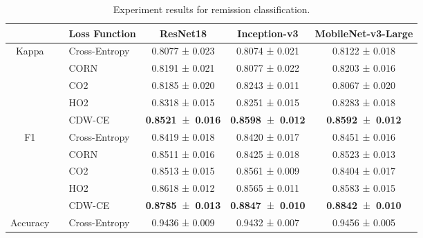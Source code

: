 \documentclass[runningheads]{llncs}
\begin{document}
\begin{table}[t!]
\caption{Experiment results for remission classification.}
\label{tab:experiment_results_remission}
\begin{adjustbox}{center}
\begin{tabular}{cllccc} 
\hline
                          &  & \textbf{Loss Function} & \textbf{ResNet18}                & \textbf{Inception-v3}            & \textbf{MobileNet-v3-Large}       \\ 
\hline
\multirow{5}{*}{Kappa}    &  & Cross-Entropy          & 0.8077 ± 0.023                   & 0.8074 ± 0.021                   & 0.8122 ± 0.018                    \\
                          &  & CORN                   & 0.8191 ± 0.021                   & 0.8077 ± 0.022                   & 0.8203 ± 0.016                    \\
                          &  & CO2                    & 0.8185 ± 0.020                   & 0.8243 ± 0.011                   & 0.8067 ± 0.020                    \\
                          &  & HO2                    & 0.8318 ± 0.015                   & 0.8251 ± 0.015                   & 0.8283 ± 0.018                    \\
                          &  & CDW-CE                 & \textbf{0.8521~}±\textbf{~0.016} & \textbf{0.8598~}±\textbf{~0.012} & \textbf{0.8592~}±\textbf{~0.012}  \\ 
\hline
\multirow{5}{*}{F1}       &  & Cross-Entropy          & 0.8419 ± 0.018                   & 0.8420 ± 0.017                   & 0.8451 ± 0.016                    \\
                          &  & CORN                   & 0.8511 ± 0.016                   & 0.8425 ± 0.018                   & 0.8523 ± 0.013                    \\
                          &  & CO2                    & 0.8513 ± 0.015                   & 0.8561 ± 0.009                   & 0.8404 ± 0.017                    \\
                          &  & HO2                    & 0.8618 ± 0.012                   & 0.8565 ± 0.011                   & 0.8583 ± 0.015                    \\
                          &  & CDW-CE                 & \textbf{0.8785~}±\textbf{~0.013} & \textbf{0.8847~}±\textbf{~0.010} & \textbf{0.8842~}±\textbf{~0.010}  \\ 
\hline
\multirow{5}{*}{Accuracy} &  & Cross-Entropy          & 0.9436 ± 0.009                   & 0.9432 ± 0.007                   & 0.9456 ± 0.005                    \\

\end{tabular}
\end{adjustbox}
\end{table}
\end{document}
